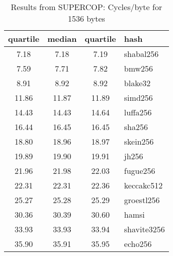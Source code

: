 \begin{table}
  \centering
  \begin{tabular}{ | c | c | c | l | }
    \hline
    \textbf{quartile} & \textbf{median} & \textbf{quartile} & \textbf{hash} \\ \hline
    7.18 & 7.18 & 7.19 & shabal256 \\ \hline
    7.59 & 7.71 & 7.82 & bmw256 \\ \hline
    8.91 & 8.92 & 8.92 & blake32 \\ \hline
    11.86 & 11.87 & 11.89 & simd256 \\ \hline
    14.43 & 14.43 & 14.64 & luffa256 \\ \hline
    16.44 & 16.45 & 16.45 & sha256 \\ \hline
    18.80 & 18.96 & 18.97 & skein256 \\ \hline
    19.89 & 19.90 & 19.91 & jh256 \\ \hline
    21.96 & 21.98 & 22.03 & fugue256 \\ \hline
    22.31 & 22.31 & 22.36 & keccakc512 \\ \hline
    25.27 & 25.28 & 25.29 & groestl256 \\ \hline
    30.36 & 30.39 & 30.60 & hamsi \\ \hline
    33.93 & 33.93 & 33.94 & shavite3256 \\ \hline
    35.90 & 35.91 & 35.95 & echo256 \\ \hline
  \end{tabular}
  \caption{Results from SUPERCOP: Cycles/byte for 1536 bytes}
  \label{tbl:supercop:1536}
\end{table}
